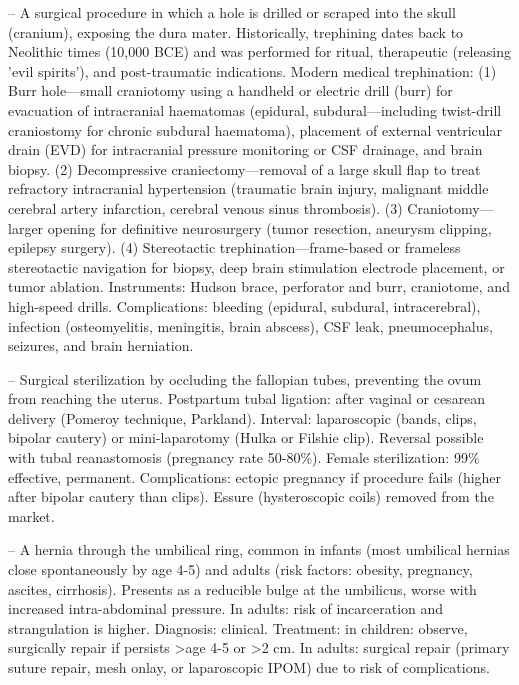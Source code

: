 -- A surgical procedure in which a hole is drilled or scraped into the skull (cranium), exposing the dura mater. Historically, trephining dates back to Neolithic times (10,000 BCE) and was performed for ritual, therapeutic (releasing 'evil spirits'), and post-traumatic indications. Modern medical trephination: (1) Burr hole—small craniotomy using a handheld or electric drill (burr) for evacuation of intracranial haematomas (epidural, subdural—including twist-drill craniostomy for chronic subdural haematoma), placement of external ventricular drain (EVD) for intracranial pressure monitoring or CSF drainage, and brain biopsy. (2) Decompressive craniectomy—removal of a large skull flap to treat refractory intracranial hypertension (traumatic brain injury, malignant middle cerebral artery infarction, cerebral venous sinus thrombosis). (3) Craniotomy—larger opening for definitive neurosurgery (tumor resection, aneurysm clipping, epilepsy surgery). (4) Stereotactic trephination—frame-based or frameless stereotactic navigation for biopsy, deep brain stimulation electrode placement, or tumor ablation. Instruments: Hudson brace, perforator and burr, craniotome, and high-speed drills. Complications: bleeding (epidural, subdural, intracerebral), infection (osteomyelitis, meningitis, brain abscess), CSF leak, pneumocephalus, seizures, and brain herniation.

-- Surgical sterilization by occluding the fallopian tubes, preventing the ovum from reaching the uterus. Postpartum tubal ligation: after vaginal or cesarean delivery (Pomeroy technique, Parkland). Interval: laparoscopic (bands, clips, bipolar cautery) or mini-laparotomy (Hulka or Filshie clip). Reversal possible with tubal reanastomosis (pregnancy rate 50-80\%). Female sterilization: 99\% effective, permanent. Complications: ectopic pregnancy if procedure fails (higher after bipolar cautery than clips). Essure (hysteroscopic coils) removed from the market.

-- A hernia through the umbilical ring, common in infants (most umbilical hernias close spontaneously by age 4-5) and adults (risk factors: obesity, pregnancy, ascites, cirrhosis). Presents as a reducible bulge at the umbilicus, worse with increased intra-abdominal pressure. In adults: risk of incarceration and strangulation is higher. Diagnosis: clinical. Treatment: in children: observe, surgically repair if persists >age 4-5 or >2 cm. In adults: surgical repair (primary suture repair, mesh onlay, or laparoscopic IPOM) due to risk of complications.


